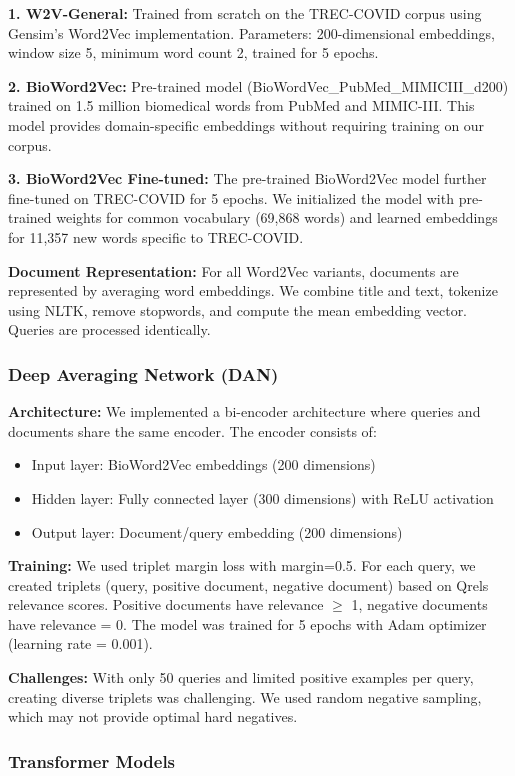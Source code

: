 \documentclass[sigconf,nonacm]{acmart}
\begin{document}
\textbf{1. W2V-General:} Trained from scratch on the TREC-COVID corpus using Gensim's Word2Vec implementation. Parameters: 200-dimensional embeddings, window size 5, minimum word count 2, trained for 5 epochs.

\textbf{2. BioWord2Vec:} Pre-trained model (BioWordVec\_PubMed\_MIMICIII\_d200) trained on 1.5 million biomedical words from PubMed and MIMIC-III. This model provides domain-specific embeddings without requiring training on our corpus.

\textbf{3. BioWord2Vec Fine-tuned:} The pre-trained BioWord2Vec model further fine-tuned on TREC-COVID for 5 epochs. We initialized the model with pre-trained weights for common vocabulary (69,868 words) and learned embeddings for 11,357 new words specific to TREC-COVID.

\textbf{Document Representation:} For all Word2Vec variants, documents are represented by averaging word embeddings. We combine title and text, tokenize using NLTK, remove stopwords, and compute the mean embedding vector. Queries are processed identically.

\subsubsection{Deep Averaging Network (DAN)}
\textbf{Architecture:} We implemented a bi-encoder architecture where queries and documents share the same encoder. The encoder consists of:
\begin{itemize}
    \item Input layer: BioWord2Vec embeddings (200 dimensions)
    \item Hidden layer: Fully connected layer (300 dimensions) with ReLU activation
    \item Output layer: Document/query embedding (200 dimensions)
\end{itemize}

\textbf{Training:} We used triplet margin loss with margin=0.5. For each query, we created triplets (query, positive document, negative document) based on Qrels relevance scores. Positive documents have relevance $\geq$ 1, negative documents have relevance = 0. The model was trained for 5 epochs with Adam optimizer (learning rate = 0.001).

\textbf{Challenges:} With only 50 queries and limited positive examples per query, creating diverse triplets was challenging. We used random negative sampling, which may not provide optimal hard negatives.

\subsubsection{Transformer Models}
\end{document}
